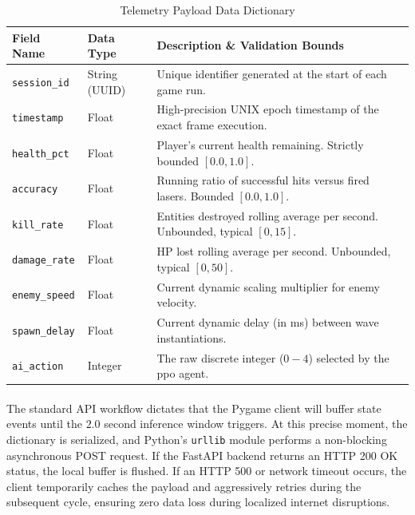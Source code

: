 \begin{table}[!ht]
\centering
\caption{Telemetry Payload Data Dictionary}
\label{tab:data_dictionary}
\renewcommand{\arraystretch}{1.5}
\begin{tabular}{|p{3cm}|p{2cm}|p{8cm}|}
\hline
\textbf{Field Name} & \textbf{Data Type} & \textbf{Description \& Validation Bounds}\\
\hline
\texttt{session\_id} & String (UUID) & Unique identifier generated at the start of each game run.\\
\hline
\texttt{timestamp} & Float & High-precision UNIX epoch timestamp of the exact frame execution.\\
\hline
\texttt{health\_pct} & Float & Player's current health remaining. Strictly bounded $[0.0, 1.0]$.\\
\hline
\texttt{accuracy} & Float & Running ratio of successful hits versus fired lasers. Bounded $[0.0, 1.0]$.\\
\hline
\texttt{kill\_rate} & Float & Entities destroyed rolling average per second. Unbounded, typical $[0, 15]$.\\
\hline
\texttt{damage\_rate} & Float & HP lost rolling average per second. Unbounded, typical $[0, 50]$.\\
\hline
\texttt{enemy\_speed} & Float & Current dynamic scaling multiplier for enemy velocity.\\
\hline
\texttt{spawn\_delay} & Float & Current dynamic delay (in ms) between wave instantiations.\\
\hline
\texttt{ai\_action} & Integer & The raw discrete integer ($0-4$) selected by the \ac{ppo} agent.\\
\hline
\end{tabular}
\end{table}

\paragraph{} The standard API workflow dictates that the Pygame client will buffer state events until the $2.0$ second inference window triggers. At this precise moment, the dictionary is serialized, and Python's \texttt{urllib} module performs a non-blocking asynchronous POST request. If the FastAPI backend returns an HTTP 200 OK status, the local buffer is flushed. If an HTTP 500 or network timeout occurs, the client temporarily caches the payload and aggressively retries during the subsequent cycle, ensuring zero data loss during localized internet disruptions.

